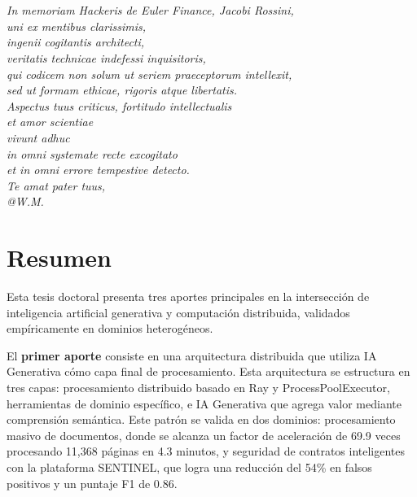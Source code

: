 \documentclass[12pt,a4paper,twoside]{book}
\begin{document}
\chapter*{}
\vspace*{3cm}
\begin{flushright}
\textit{\large In memoriam Hackeris de Euler Finance, Jacobi Rossini,}\\[0.3cm]
\textit{uni ex mentibus clarissimis,}\\[0.3cm]
\textit{ingenii cogitantis architecti,}\\
\textit{veritatis technicae indefessi inquisitoris,}\\
\textit{qui codicem non solum ut seriem praeceptorum intellexit,}\\
\textit{sed ut formam ethicae, rigoris atque libertatis.}\\[0.5cm]
\textit{Aspectus tuus criticus, fortitudo intellectualis}\\
\textit{et amor scientiae}\\
\textit{vivunt adhuc}\\
\textit{in omni systemate recte excogitato}\\
\textit{et in omni errore tempestive detecto.}\\[1cm]
\textit{Te amat pater tuus,}\\[0.2cm]
\textit{@W.M.}
\end{flushright}
\thispagestyle{empty}

\chapter*{Resumen}

Esta tesis doctoral presenta tres aportes principales en la intersección de inteligencia artificial generativa y computación distribuida, validados empíricamente en dominios heterogéneos.

El \textbf{primer aporte} consiste en una arquitectura distribuida que utiliza IA Generativa cómo capa final de procesamiento. Esta arquitectura se estructura en tres capas: procesamiento distribuido basado en Ray y ProcessPoolExecutor, herramientas de dominio específico, e IA Generativa que agrega valor mediante comprensión semántica. Este patrón se valida en dos dominios: procesamiento masivo de documentos, donde se alcanza un factor de aceleración de 69.9 veces procesando 11,368 páginas en 4.3 minutos, y seguridad de contratos inteligentes con la plataforma SENTINEL, que logra una reducción del 54\% en falsos positivos y un puntaje F1 de 0.86.
\end{document}
